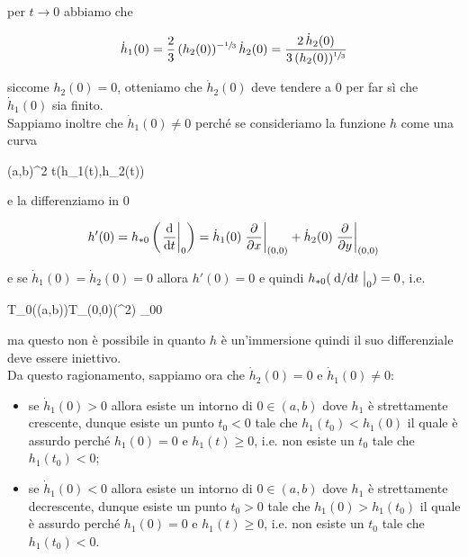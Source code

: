 per $ t \to 0 $ abbiamo che

\begin{equation}
		\dot{h}_{1}(0) = \dfrac{2}{3} \, (h_{2}(0))^{-\sfrac{1}{3}} \, \dot{h}_{2}(0) %
		= \dfrac{2 \, \dot{h}_{2}(0)}{3 \, (h_{2}(0))^{\sfrac{1}{3}}}
\end{equation}

siccome $ h_{2}(0)=0 $, otteniamo che $ \dot{h}_{2}(0) $ deve tendere a 0 per far sì che $ \dot{h}_{1}(0) $ sia finito.\\
Sappiamo inoltre che $ \dot{h}_{1}(0) \neq 0 $ perché se consideriamo la funzione $ h $ come una curva

	{(a,b)}{\R^{2}}
	{t}{(h_{1}(t),h_{2}(t))}

e la differenziamo in $ 0 $

\begin{equation}
	h'(0) = h_{*0} \left( \eval{ \dv{t} }_{0} \right) %
	= \dot{h}_{1}(0) \eval{ \pdv{x} }_{(0,0)} + \dot{h}_{2}(0) \eval{ \pdv{y} }_{(0,0)}
\end{equation}

e se $ \dot{h}_{1}(0) = \dot{h}_{2}(0) = 0 $ allora $ h'(0) = 0 $ e quindi $ h_{*0} ( \eval{ \dv*{t} }_{0} ) = 0 $, i.e.

	{T_{0}((a,b))}{T_{(0,0)}(\R^{2})}
	{_{0}}{0}

ma questo non è possibile in quanto $ h $ è un'immersione quindi il suo differenziale deve essere iniettivo.\\
Da questo ragionamento, sappiamo ora che $ \dot{h}_{2}(0)=0 $ e $ \dot{h}_{1}(0) \neq 0 $:

\begin{itemize}
	\item se $ \dot{h}_{1}(0) > 0 $ allora esiste un intorno di $ 0 \in (a,b) $ dove $ h_{1} $ è strettamente crescente, dunque esiste un punto $ t_{0}<0 $ tale che $ h_{1}(t_{0}) < h_{1}(0) $ il quale è assurdo perché $ h_{1}(0) = 0 $ e $ h_{1}(t) \geqslant 0 $, i.e. non esiste un $ t_{0} $ tale che $ h_{1}(t_{0}) < 0 $;
	
	\item se $ \dot{h}_{1}(0) < 0 $ allora esiste un intorno di $ 0 \in (a,b) $ dove $ h_{1} $ è strettamente decrescente, dunque esiste un punto $ t_{0}>0 $ tale che $ h_{1}(0) > h_{1}(t_{0}) $ il quale è assurdo perché $ h_{1}(0) = 0 $ e $ h_{1}(t) \geqslant 0 $, i.e. non esiste un $ t_{0} $ tale che $ h_{1}(t_{0}) < 0 $.
\end{itemize}

